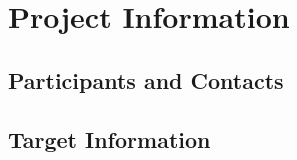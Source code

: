 %
%
%
\clearpage

\chapter{Project Information}
\label{chapter:ProjectInformation} 

\section{Participants and Contacts} 
\label{section:ParticipantsContacts}

\SetParticipantsAndContactsTable
\normalsize


\clearpage

\section{Target Information}
\label{section:TargetInformation}
\SetTargetInformation

